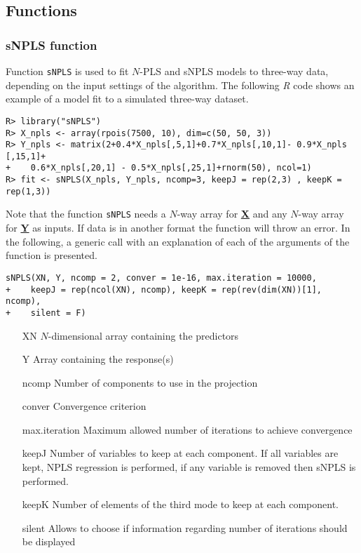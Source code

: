 \subsection{Functions}
\subsubsection{sNPLS function}
Function \texttt{sNPLS} is used to fit $N$-PLS and sNPLS models to three-way data, depending on the input settings of the algorithm. The following \textit{R} code shows an example of a model fit to a simulated three-way dataset.

\begin{verbatim}
R> library("sNPLS")
R> X_npls <- array(rpois(7500, 10), dim=c(50, 50, 3))
R> Y_npls <- matrix(2+0.4*X_npls[,5,1]+0.7*X_npls[,10,1]- 0.9*X_npls [,15,1]+ 
+    0.6*X_npls[,20,1] - 0.5*X_npls[,25,1]+rnorm(50), ncol=1)
R> fit <- sNPLS(X_npls, Y_npls, ncomp=3, keepJ = rep(2,3) , keepK = rep(1,3))
\end{verbatim}

Note that the function \texttt{sNPLS} needs a $N$-way array for \textbf{\underline{X}} and any $N$-way array for \textbf{\underline{Y}} as inputs. If data is in another format the function will throw an error. In the following, a generic call with an explanation of each of the arguments of the function is presented.

\begin{verbatim}
sNPLS(XN, Y, ncomp = 2, conver = 1e-16, max.iteration = 10000,
+    keepJ = rep(ncol(XN), ncomp), keepK = rep(rev(dim(XN))[1], ncomp),
+    silent = F)
\end{verbatim}

\begin{itemize}[leftmargin=2.5cm]
\item[XN] $N$-dimensional array containing the predictors
\item[Y] Array containing the response(s)
\item[ncomp] Number of components to use in the projection
\item[conver] Convergence criterion
\item[max.iteration] Maximum allowed number of iterations to achieve convergence
\item[keepJ] Number of variables to keep at each component. If all variables are kept, NPLS regression is performed, if any variable is removed then sNPLS is performed.
\item[keepK] Number of elements of the third mode to keep at each component.
\item[silent] Allows to choose if information regarding number of iterations should be displayed
\end{itemize}

